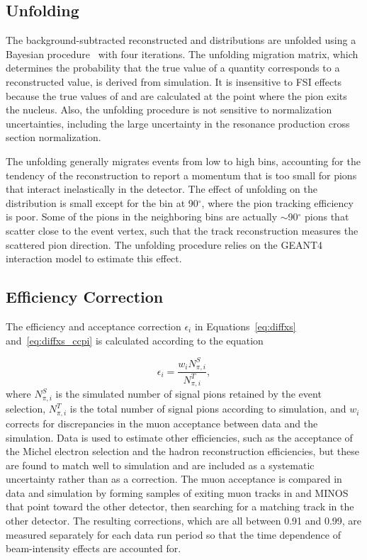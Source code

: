 \subsection{Unfolding}
The background-subtracted reconstructed \Tpi and \thetapi distributions are unfolded using a Bayesian 
procedure~\cite{D'Agostini:1994zf} with four iterations.  The unfolding migration matrix, which determines the probability that 
the true value of a quantity corresponds to a reconstructed value, is derived from simulation.  It is insensitive to FSI effects 
because the true values of \Tpi and \thetapi are calculated at the point where the pion exits the nucleus.  Also, 
the unfolding procedure is not sensitive to normalization uncertainties, including the large uncertainty in the resonance 
production cross section normalization.

The unfolding generally migrates events from low to high \Tpi bins, accounting for the tendency of the reconstruction to report a 
momentum that is too small for pions that interact inelastically in the detector.  The effect of unfolding on 
the \thetapi distribution is small except for the bin at 90$^{\circ}$, where the pion tracking efficiency is poor.  
Some of the pions in the neighboring bins are actually $\sim$90$^{\circ}$ pions that scatter close to the event vertex, 
such that the track reconstruction measures the scattered pion direction.  
The unfolding procedure relies on the GEANT4 interaction model to estimate this effect. 

\subsection{Efficiency Correction}
The efficiency and acceptance correction $\epsilon_{i}$ in Equations~\ref{eq:diffxs} and~\ref{eq:diffxs_ccpi} is calculated according to the
equation

\begin{equation}\label{eq:effdefinition}
\epsilon_{i} = \frac{w_{i}N_{\pi,i}^{S}}{N_{\pi,i}^{T}}, 
\end{equation}
where $N_{\pi,i}^{S}$ is the simulated number of signal pions retained by the event selection, $N_{\pi,i}^{T}$ is the total number of signal pions 
according to simulation, 
and $w_{i}$ corrects for discrepancies in the muon acceptance between data and the simulation.  Data is used to estimate 
other efficiencies, such as the acceptance of the Michel electron selection and the hadron reconstruction efficiencies, but these are found 
to match well to simulation and are included as a systematic uncertainty rather than as a correction.  The muon acceptance is 
compared in data and simulation by forming samples of exiting muon tracks in \minerva and MINOS that point toward the other detector, then 
searching for a matching track in the other detector.  The resulting corrections, which are all between 0.91 and 0.99, are measured separately for each 
data run period so that the time dependence of beam-intensity effects are accounted for.

